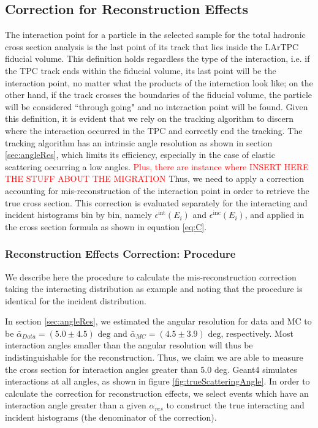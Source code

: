 \subsection{Correction for Reconstruction Effects}\label{ch:EFFXS}
The interaction point for a particle in the selected sample for the total hadronic cross section analysis is the last point of its track that lies inside the LArTPC fiducial volume. This definition holds regardless the type of the interaction, i.e. if the TPC track ends within the fiducial volume, its last point will be the interaction point, no matter what the products of the interaction look like; on the other hand, if the track crosses the boundaries of the fiducial volume, the particle will be considered ``through going" and no interaction point will be found.  Given this definition, it is evident that we rely on the tracking algorithm to discern where the interaction occurred in the TPC  and correctly end the tracking. The tracking algorithm has an intrinsic angle resolution as shown in section \ref{sec:angleRes}, which limits its efficiency, especially in the case of elastic scattering occurring a low angles. \textcolor{red}{Plus, there are instance where INSERT HERE THE STUFF ABOUT THE MIGRATION}
Thus, we need to apply a correction accounting for mis-reconstruction of the interaction point in order to retrieve the true cross section.  This correction is evaluated separately for the interacting and incident histograms bin by bin, namely $\epsilon^{\text{int}}(E_i)$ and  $\epsilon^{\text{inc}}(E_i)$, and applied in the cross section formula as shown in  equation \ref{eq:C}. 

\subsubsection{Reconstruction Effects Correction: Procedure}\label{sec:EffCorrection}
We describe here the procedure to calculate the mis-reconstruction correction taking the interacting distribution as example and noting that the procedure is identical for the incident distribution. 

In section \ref{sec:angleRes}, we estimated the angular resolution for data and MC to be $\bar\alpha_{Data} = (5.0 \pm 4.5) \text{ deg}$  and 
$\bar\alpha_{MC} = (4.5 \pm 3.9) \text{ deg}$, respectively.  Most interaction angles smaller than the angular resolution will thus be indistinguishable  for the reconstruction. Thus, we claim we are able to  measure the cross section for interaction angles greater than 5.0 deg. Geant4 simulates interactions at all angles, as shown in figure \ref{fig:trueScatteringAngle}. In order to calculate the correction for reconstruction effects,  we select events which have an interaction angle greater than a given $\alpha_{res}$ to construct the true interacting and incident histograms (the denominator of the correction).

